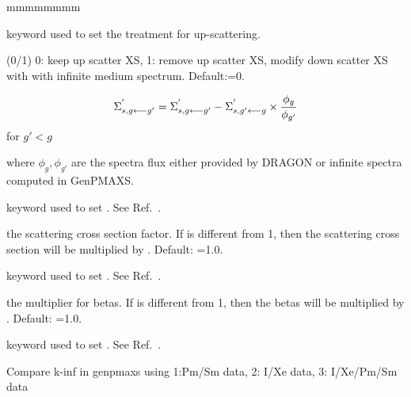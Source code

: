 \begin{ListeDeDescription}{mmmmmmmm}
\item[\moc{IUPS}]   keyword used to set the treatment for up-scattering.

\item[\dusa{iups}] (0/1) 0: keep up scatter XS, 1: remove up scatter XS, modify down scatter XS with with infinite medium spectrum. Default:=0.  

$$
\Sigma^{'}_{s,g \longleftarrow g'}=\Sigma^{'}_{s,g \longleftarrow g'}-\Sigma^{'}_{s,g' \longleftarrow g} \times {\phi _{g}\over\phi _{g'}}
$$
for $g'<g$

where $\phi _{g},\phi _{g'}$ are the spectra flux either provided by DRAGON or infinite spectra computed in GenPMAXS.

\item[\moc{SFAC}]  keyword used to set . See Ref.~.
\item[\dusa{sfac}] the scattering cross section factor. If  is different from 1, then the scattering cross section will be multiplied by . Default: =1.0.
\item[\moc{BFAC}]  keyword used to set . See Ref.~.
\item[\dusa{bfac}] the multiplier for betas. If  is different from 1, then the betas will be multiplied by . Default: =1.0.
\item[\moc{XESM}]  keyword used to set . See Ref.~.
\item[\dusa{xesmopt}] Compare k-inf in genpmaxs using 1:Pm/Sm data, 2: I/Xe data, 3: I/Xe/Pm/Sm data
\end{ListeDeDescription}

\clearpage
